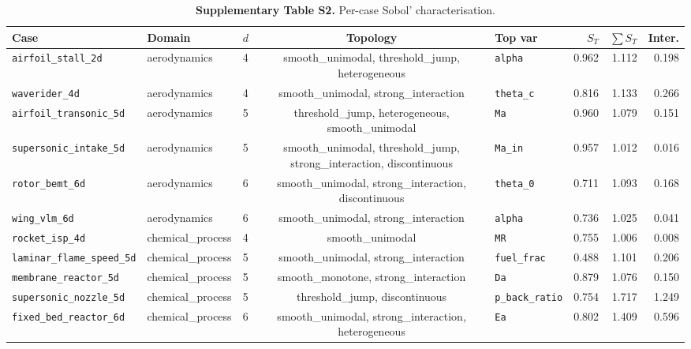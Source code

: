 \begin{table}[htbp]
\centering
\caption{\textbf{Supplementary Table S2.} Per-case Sobol' characterisation.}
\label{tab:si_sobol}
\footnotesize
\setlength{\tabcolsep}{3pt}
\begin{tabular}{@{}lllclrrr@{}}
\toprule
\textbf{Case} & \textbf{Domain} & $d$ & \textbf{Topology} & \textbf{Top var} & $S_T$ & $\sum S_T$ & \textbf{Inter.} \\
\midrule
\texttt{airfoil\_stall\_2d} & aerodynamics & 4 & smooth\_unimodal, threshold\_jump, heterogeneous & \texttt{alpha} & 0.962 & 1.112 & 0.198 \\
\texttt{waverider\_4d} & aerodynamics & 4 & smooth\_unimodal, strong\_interaction & \texttt{theta\_c} & 0.816 & 1.133 & 0.266 \\
\texttt{airfoil\_transonic\_5d} & aerodynamics & 5 & threshold\_jump, heterogeneous, smooth\_unimodal & \texttt{Ma} & 0.960 & 1.079 & 0.151 \\
\texttt{supersonic\_intake\_5d} & aerodynamics & 5 & smooth\_unimodal, threshold\_jump, strong\_interaction, discontinuous & \texttt{Ma\_in} & 0.957 & 1.012 & 0.016 \\
\texttt{rotor\_bemt\_6d} & aerodynamics & 6 & smooth\_unimodal, strong\_interaction, discontinuous & \texttt{theta\_0} & 0.711 & 1.093 & 0.168 \\
\texttt{wing\_vlm\_6d} & aerodynamics & 6 & smooth\_unimodal, strong\_interaction & \texttt{alpha} & 0.736 & 1.025 & 0.041 \\
\texttt{rocket\_isp\_4d} & chemical\_process & 4 & smooth\_unimodal & \texttt{MR} & 0.755 & 1.006 & 0.008 \\
\texttt{laminar\_flame\_speed\_5d} & chemical\_process & 5 & smooth\_unimodal, strong\_interaction & \texttt{fuel\_frac} & 0.488 & 1.101 & 0.206 \\
\texttt{membrane\_reactor\_5d} & chemical\_process & 5 & smooth\_monotone, strong\_interaction & \texttt{Da} & 0.879 & 1.076 & 0.150 \\
\texttt{supersonic\_nozzle\_5d} & chemical\_process & 5 & threshold\_jump, discontinuous & \texttt{p\_back\_ratio} & 0.754 & 1.717 & 1.249 \\
\texttt{fixed\_bed\_reactor\_6d} & chemical\_process & 6 & smooth\_unimodal, strong\_interaction, heterogeneous & \texttt{Ea} & 0.802 & 1.409 & 0.596 \\

\end{tabular}
\end{table}

